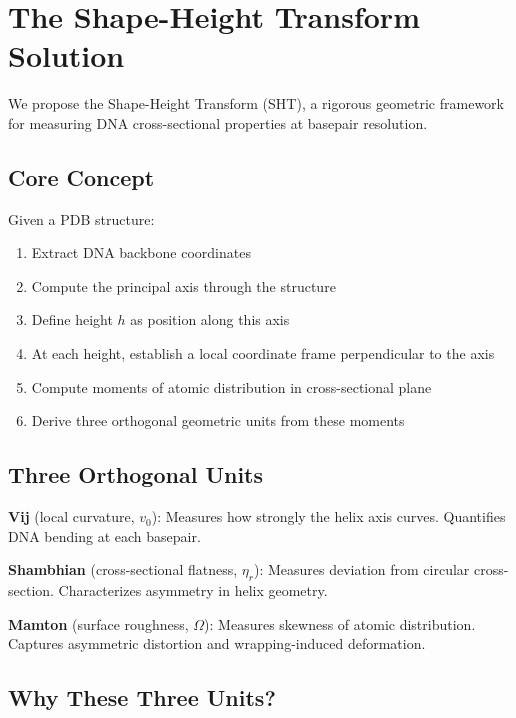 \section{The Shape-Height Transform Solution}

We propose the Shape-Height Transform (SHT), a rigorous geometric framework for measuring DNA cross-sectional properties at basepair resolution.

\subsection{Core Concept}

Given a PDB structure:

\begin{enumerate}
    \item Extract DNA backbone coordinates
    \item Compute the principal axis through the structure
    \item Define height $h$ as position along this axis
    \item At each height, establish a local coordinate frame perpendicular to the axis
    \item Compute moments of atomic distribution in cross-sectional plane
    \item Derive three orthogonal geometric units from these moments
\end{enumerate}

\subsection{Three Orthogonal Units}

\begin{keyresult}
    \textbf{Vij} (local curvature, $v_0$): Measures how strongly the helix axis curves. Quantifies DNA bending at each basepair.
    
    \textbf{Shambhian} (cross-sectional flatness, $\eta_r$): Measures deviation from circular cross-section. Characterizes asymmetry in helix geometry.
    
    \textbf{Mamton} (surface roughness, $\Omega$): Measures skewness of atomic distribution. Captures asymmetric distortion and wrapping-induced deformation.
\end{keyresult}

\subsection{Why These Three Units?}

